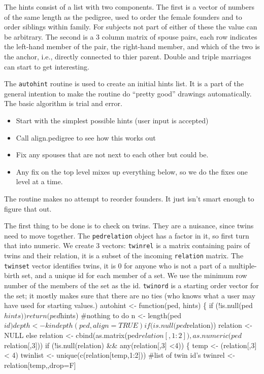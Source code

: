 \documentclass{article}
\begin{document}
The hints consist of a list with two components.
The first is a vector of numbers of the same length as the pedigree,
used to order the female founders and to order siblings within
family.  For subjects not part of either of these the value can be 
arbitrary.  
The second is a 3 column matrix of spouse pairs, each row indicates the
left-hand member of the pair, the right-hand member, and which of the two
is the anchor, i.e., directly connected to thier parent.
Double and triple marriages can start to get interesting.


The {\tt{}autohint} routine is used to create an initial hints list.
It is a part of the general intention to make the routine do
``pretty good'' drawings automatically.                 
The basic algorithm is trial and error. 
\begin{itemize}
  \item Start with the simplest possible hints (user input is accepted)
  \item Call align.pedigree to see how this works out
  \item Fix any spouses that are not next to each other but could be.
  \item Any fix on the top level mixes up everything below, so we do the
    fixes one level at a time.
\end{itemize}
The routine makes no attempt to reorder founders.  It just isn't smart enough%
to figure that out.

The first thing to be done is to check on twins.  They are a nuisance, since
twins need to move together.  The {\tt{}ped{}relation} object has a factor in it, 
so first turn that into numeric.
We create 3 vectors: {\tt{}twinrel} is a matrix containing pairs of twins and
their relation, it is a subset of the incoming {\tt{}relation} matrix.
The {\tt{}twinset} vector identifies twins, it is 0 for anyone who is not a 
part of a 
multiple-birth set, and a unique id for each member of a set.  We use the
minimum row number of the members of the set as the id.
{\tt{}twinord} is a starting order vector for the set; it mostly makes sure
that there are no ties (who knows what a user may have used for starting 
values.)  
\nwenddocs{}\endmoddef
autohint <- function(ped, hints) \{
    if (!is.null(ped$hints)) return(ped$hints)  #nothing to do
    n <- length(ped$id)
    depth <- kindepth(ped, align=TRUE)

    if (is.null(ped$relation)) relation <- NULL
    else  relation <- cbind(as.matrix(ped$relation[,1:2]), 
                            as.numeric(ped$relation[,3]))
    if (!is.null(relation) && any(relation[,3] <4)) \{
        temp <- (relation[,3] < 4)
        twinlist <- unique(c(relation[temp,1:2]))  #list of twin id's 
        twinrel  <- relation[temp,,drop=F]
        
\end{document}
